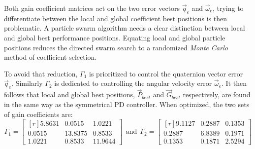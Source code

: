 Both gain coefficient matrices act on the two error vectors $\vec{q}_e$ and $\vec{\omega}_e$, trying to differentiate between the local and global coefficient best positions is then problematic. A particle swarm algorithm needs a clear distinction between local and global best performance positions. Equating local and global particle positions reduces the directed swarm search to a randomized \emph{Monte Carlo} method of coefficient selection.
\par
To avoid that reduction, $\Gamma_1$ is prioritized to control the quaternion vector error $\vec{q}_e$. Similarly $\Gamma_2$ is dedicated to controlling the angular velocity error $\vec{\omega}_e$. It then follows that local and global best positions, $\vec{P}_{best}$ and $\vec{G}_{best}$ respectively, are found in the same way as the symmetrical PD controller. When optimized, the two sets of gain coefficients are:
\begin{equation}\label{eq:optimized-IBC}
\Gamma_1 = \begin{bmatrix*}[r]
5.8631 & 0.0515 & 1.0221\\
0.0515 & 13.8375 & 0.8533\\
1.0221 & 0.8533 & 11.9644
\end{bmatrix*}
~~\text{and}~~
\Gamma_2 = \begin{bmatrix*}[r]
9.1127 & 0.2887 & 0.1353\\
0.2887 & 6.8389 & 0.1971\\
0.1353 & 0.1871 & 2.5294
\end{bmatrix*}
\end{equation}
